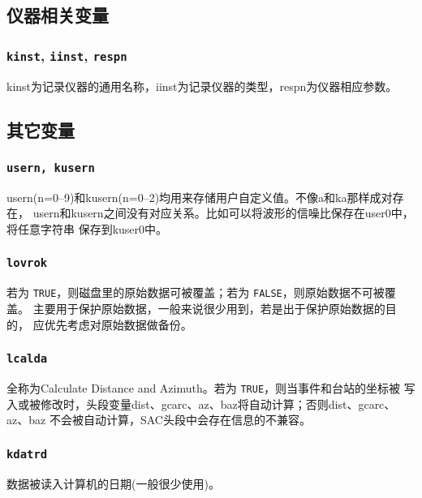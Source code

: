 \subsection{仪器相关变量}
\subsubsection{\texttt{kinst}, \texttt{iinst}\dag, \texttt{respn}\dag}
kinst为记录仪器的通用名称，iinst为记录仪器的类型，respn为仪器相应参数。

\subsection{其它变量}
\subsubsection{\texttt{usern, kusern}}
usern(n=0--9)和kusern(n=0--2)均用来存储用户自定义值。不像a和ka那样成对存在，
usern和kusern之间没有对应关系。比如可以将波形的信噪比保存在user0中，将任意字符串
保存到kuser0中。

\subsubsection{\texttt{lovrok}}
若为 \texttt{TRUE}，则磁盘里的原始数据可被覆盖；若为 \texttt{FALSE}，则原始数据不可被覆盖。
主要用于保护原始数据，一般来说很少用到，若是出于保护原始数据的目的，
应优先考虑对原始数据做备份。

\subsubsection{\texttt{lcalda}}
全称为Calculate Distance and Azimuth。若为 \texttt{TRUE}，则当事件和台站的坐标被
写入或被修改时，头段变量dist、gcarc、az、baz将自动计算；否则dist、gcarc、az、baz
不会被自动计算，SAC头段中会存在信息的不兼容。

\subsubsection{\texttt{kdatrd}}
数据被读入计算机的日期(一般很少使用)。
